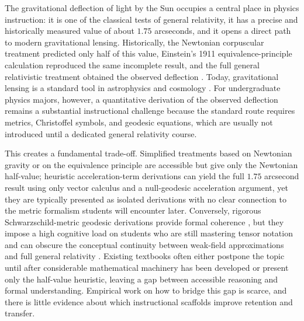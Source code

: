 \documentclass{article}
\begin{document}
The gravitational deflection of light by the Sun occupies a central place in physics instruction: it is one of the classical tests of general relativity, it has a precise and historically measured value of about \(1.75\) arcseconds, and it opens a direct path to modern gravitational lensing. Historically, the Newtonian corpuscular treatment predicted only half of this value, Einstein’s 1911 equivalence-principle calculation reproduced the same incomplete result, and the full general relativistic treatment obtained the observed deflection \cite{soldner1804ablenkung,einstein1911einfluss,einstein1916grundlage,dyson1920determination}. Today, gravitational lensing is a standard tool in astrophysics and cosmology \cite{schneider1992gravitational}. For undergraduate physics majors, however, a quantitative derivation of the observed deflection remains a substantial instructional challenge because the standard route requires metrics, Christoffel symbols, and geodesic equations, which are usually not introduced until a dedicated general relativity course.

This creates a fundamental trade-off. Simplified treatments based on Newtonian gravity or on the equivalence principle are accessible but give only the Newtonian half-value; heuristic acceleration-term derivations can yield the full \(1.75\) arcsecond result using only vector calculus and a null-geodesic acceleration argument, yet they are typically presented as isolated derivations with no clear connection to the metric formalism students will encounter later. Conversely, rigorous Schwarzschild-metric geodesic derivations provide formal coherence \cite{hartle2003gravity,carroll2004spacetime,moore2013general}, but they impose a high cognitive load on students who are still mastering tensor notation and can obscure the conceptual continuity between weak-field approximations and full general relativity \cite{sweller1988cognitive}. Existing textbooks often either postpone the topic until after considerable mathematical machinery has been developed or present only the half-value heuristic, leaving a gap between accessible reasoning and formal understanding. Empirical work on how to bridge this gap is scarce, and there is little evidence about which instructional scaffolds improve retention and transfer.
\end{document}
